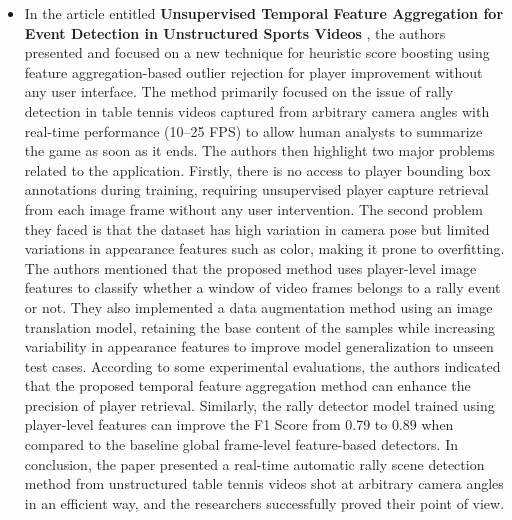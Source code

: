 \documentclass[12pt]{article}
\begin{document}
\begin{itemize}
        \item
        In the article entitled \textbf{Unsupervised Temporal Feature Aggregation for Event Detection in Unstructured Sports Videos} \cite{8959041}, the authors presented and focused on a new technique for heuristic score boosting using feature aggregation-based outlier rejection for player improvement without any user interface. The method primarily focused on the issue of rally detection in table tennis videos captured from arbitrary camera angles with real-time performance (10--25 FPS) to allow human analysts to summarize the game as soon as it ends. The authors then highlight two major problems related to the application. Firstly, there is no access to player bounding box annotations during training, requiring unsupervised player capture retrieval from each image frame without any user intervention. The second problem they faced is that the dataset has high variation in camera pose but limited variations in appearance features such as color, making it prone to overfitting. The authors mentioned that the proposed method uses player-level image features to classify whether a window of video frames belongs to a rally event or not. They also implemented a data augmentation method using an image translation model, retaining the base content of the samples while increasing variability in appearance features to improve model generalization to unseen test cases. According to some experimental evaluations, the authors indicated that the proposed temporal feature aggregation method can enhance the precision of player retrieval. Similarly, the rally detector model trained using player-level features can improve the F1 Score from 0.79 to 0.89 when compared to the baseline global frame-level feature-based detectors. In conclusion, the paper presented a real-time automatic rally scene detection method from unstructured table tennis videos shot at arbitrary camera angles in an efficient way, and the researchers successfully proved their point of view.
        

\end{itemize}
\end{document}
